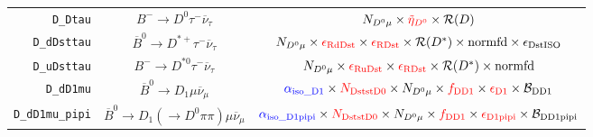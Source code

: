 \begin{landscape}
\begin{table}
\begin{tabular}{r|c|c}
         \texttt{D\_Dtau} &                   $B^- \rightarrow D^0 \tau^- \overline{\nu}_\tau$                   &                                                                                                                                                $N_{D^0 \mu} \times \textcolor{red}{\tilde{\eta}_{D^0}} \times \mathcal{R}(D)$                                                                                                                                                 \\
      \texttt{D\_dDsttau} &            $\overline{B}^0 \rightarrow D^{*+} \tau^- \overline{\nu}_\tau$            &                                                                                              $N_{D^0 \mu} \times \textcolor{red}{\epsilon_\text{RdDst}} \times \textcolor{red}{\epsilon_\text{RDst}} \times \mathcal{R}(D^*) \times \text{normfd} \times \epsilon_\text{DstISO}$                                                                                              \\
      \texttt{D\_uDsttau} &                 $B^- \rightarrow D^{*0} \tau^- \overline{\nu}_\tau$                  &                                                                                                             $N_{D^0 \mu} \times \textcolor{red}{\epsilon_\text{RuDst}} \times \textcolor{red}{\epsilon_\text{RDst}} \times \mathcal{R}(D^*) \times \text{normfd}$                                                                                                             \\
        \texttt{D\_dD1mu} &               $\overline{B}^0 \rightarrow D_1 \mu \overline{\nu}_\mu$                &                                                                              $\textcolor{blue}{\alpha_\text{iso\_D1}} \times \textcolor{red}{N_\text{DststD0}} \times N_{D^0 \mu} \times \textcolor{red}{f_\text{DD1}} \times \textcolor{red}{\epsilon_\text{D1}} \times \mathcal{B}_\text{DD1}$                                                                              \\
  \texttt{D\_dD1mu\_pipi} &   $\overline{B}^0 \rightarrow D_1 (\rightarrow D^0 \pi\pi) \mu \overline{\nu}_\mu$   &                                                                        $\textcolor{blue}{\alpha_\text{iso\_D1pipi}} \times \textcolor{red}{N_\text{DststD0}} \times N_{D^0 \mu} \times \textcolor{red}{f_\text{DD1}} \times \textcolor{red}{\epsilon_\text{D1pipi}} \times \mathcal{B}_\text{DD1pipi}$                                                                        \\

\end{tabular}
\end{table}
\end{landscape}
